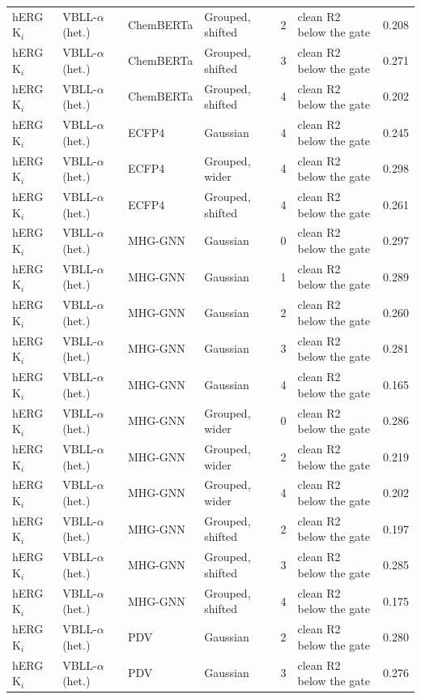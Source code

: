 {\begin{longtable}{llllcll}
hERG K$_i$ & VBLL-$\alpha$ (het.) & ChemBERTa & Grouped, shifted & 2 & clean R2 below the gate & 0.208 \\
hERG K$_i$ & VBLL-$\alpha$ (het.) & ChemBERTa & Grouped, shifted & 3 & clean R2 below the gate & 0.271 \\
hERG K$_i$ & VBLL-$\alpha$ (het.) & ChemBERTa & Grouped, shifted & 4 & clean R2 below the gate & 0.202 \\
hERG K$_i$ & VBLL-$\alpha$ (het.) & ECFP4 & Gaussian & 4 & clean R2 below the gate & 0.245 \\
hERG K$_i$ & VBLL-$\alpha$ (het.) & ECFP4 & Grouped, wider & 4 & clean R2 below the gate & 0.298 \\
hERG K$_i$ & VBLL-$\alpha$ (het.) & ECFP4 & Grouped, shifted & 4 & clean R2 below the gate & 0.261 \\
hERG K$_i$ & VBLL-$\alpha$ (het.) & MHG-GNN & Gaussian & 0 & clean R2 below the gate & 0.297 \\
hERG K$_i$ & VBLL-$\alpha$ (het.) & MHG-GNN & Gaussian & 1 & clean R2 below the gate & 0.289 \\
hERG K$_i$ & VBLL-$\alpha$ (het.) & MHG-GNN & Gaussian & 2 & clean R2 below the gate & 0.260 \\
hERG K$_i$ & VBLL-$\alpha$ (het.) & MHG-GNN & Gaussian & 3 & clean R2 below the gate & 0.281 \\
hERG K$_i$ & VBLL-$\alpha$ (het.) & MHG-GNN & Gaussian & 4 & clean R2 below the gate & 0.165 \\
hERG K$_i$ & VBLL-$\alpha$ (het.) & MHG-GNN & Grouped, wider & 0 & clean R2 below the gate & 0.286 \\
hERG K$_i$ & VBLL-$\alpha$ (het.) & MHG-GNN & Grouped, wider & 2 & clean R2 below the gate & 0.219 \\
hERG K$_i$ & VBLL-$\alpha$ (het.) & MHG-GNN & Grouped, wider & 4 & clean R2 below the gate & 0.202 \\
hERG K$_i$ & VBLL-$\alpha$ (het.) & MHG-GNN & Grouped, shifted & 2 & clean R2 below the gate & 0.197 \\
hERG K$_i$ & VBLL-$\alpha$ (het.) & MHG-GNN & Grouped, shifted & 3 & clean R2 below the gate & 0.285 \\
hERG K$_i$ & VBLL-$\alpha$ (het.) & MHG-GNN & Grouped, shifted & 4 & clean R2 below the gate & 0.175 \\
hERG K$_i$ & VBLL-$\alpha$ (het.) & PDV & Gaussian & 2 & clean R2 below the gate & 0.280 \\
hERG K$_i$ & VBLL-$\alpha$ (het.) & PDV & Gaussian & 3 & clean R2 below the gate & 0.276 \\

\end{longtable}}
